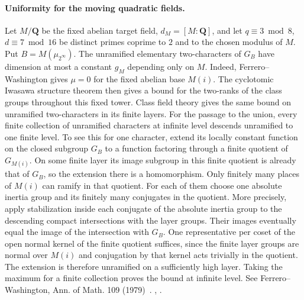 \paragraph{Uniformity for the moving quadratic fields.}
Let \(M/\mathbf Q\) be the fixed abelian target field, \(d_M=[M:\mathbf Q]\),
and let \(q\equiv3\bmod8\), \(d\equiv7\bmod16\) be distinct primes
coprime to \(2\) and to the chosen modulus of \(M\).
Put \(B=M(\mu_{2^\infty})\). The unramified elementary
two-characters of \(G_B\) have dimension at most a constant \(g_M\)
depending only on \(M\). Indeed, Ferrero--Washington gives
\(\mu=0\) for the fixed abelian base \(M(i)\). The cyclotomic
Iwasawa structure theorem then gives a bound for the two-ranks of the
class groups throughout this fixed tower. Class field theory gives
the same bound on unramified two-characters in its finite layers.
For the passage to the union, every finite collection of unramified
characters at infinite level descends unramified to one finite level.
To see this for one character, extend its locally constant function on
the closed subgroup \(G_B\) to a function factoring through a finite
quotient of \(G_{M(i)}\). On some finite layer its image subgroup in
this finite quotient is already that of \(G_B\), so the extension
there is a homomorphism. Only finitely many places of \(M(i)\) can
ramify in that quotient. For each of them choose one absolute inertia
group and its finitely many conjugates in the quotient. More precisely,
apply stabilization inside each conjugate of the absolute inertia
group to the descending compact intersections with the layer groups.
Their images eventually equal the image of the intersection with
\(G_B\). One representative per coset of the open normal kernel of
the finite quotient suffices, since the finite layer groups are normal
over \(M(i)\) and conjugation by that kernel acts trivially in the
quotient. The extension is therefore unramified on a sufficiently
high layer. Taking the maximum for a finite collection proves the
bound at infinite level.
See Ferrero--Washington, Ann. of Math. 109 (1979)~\cite{ferreroWashington}.
,
.

